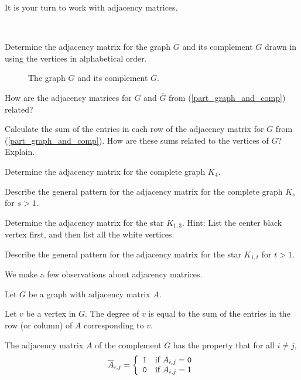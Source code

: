 It is your turn to work with adjacency matrices.

\begin{act}
\label{act_adj_matrix}
~
    \begin{actpart}
        \item \label{part_graph_and_comp} Determine the adjacency matrix for the graph $G$ and its complement $\overline{G}$ drawn in  using the vertices in alphabetical order.  
        
        \begin{figure}[hbtp]
            \centering
            
            \caption{The graph $G$ and its complement $\overline{G}$.}
            \label{fig_graph_and_comp}
        \end{figure}
        \item How are the adjacency matrices for $G$ and $\overline{G}$ from (\ref{part_graph_and_comp}) related?

        \item Calculate the sum of the entries in each row of the adjacency matrix for $G$ from (\ref{part_graph_and_comp}).  How are these sums related to the vertices of $G$?  Explain.
        \item Determine the adjacency matrix for the complete graph $K_4$. 
        \item Describe the general pattern for the adjacency matrix for the complete graph $K_s$ for $s>1$.   
        \item Determine the adjacency matrix for the star $K_{1,3}$.  Hint: List the center black vertex first, and then list all the white vertices.
        \item Describe the general pattern for the adjacency matrix for the star $K_{1,t}$ for $t > 1$.
    \end{actpart}
\end{act}

We make a few observations about adjacency matrices.

\begin{thm}
\label{thm_adj_mat}
Let $G$ be a graph with adjacency matrix $A$. 
    \begin{apart}
        \item Let $v$ be a vertex in $G$.  The degree of $v$ is equal to the sum of the entries in the row (or column) of $A$ corresponding to $v$.
        \item The adjacency matrix $\overline{A}$ of the complement $\overline{G}$ has the property that for all $i \neq j$,     
            $$\overline{A}_{i,j} 
            = \left\{
                \begin{array}{cc}
                    1 & \text{if }A_{i,j}=\texttt{0} \\
                    \texttt{0} & \text{if }A_{i,j}=1
                \end{array}
            \right.$$
    \end{apart}
\end{thm}


